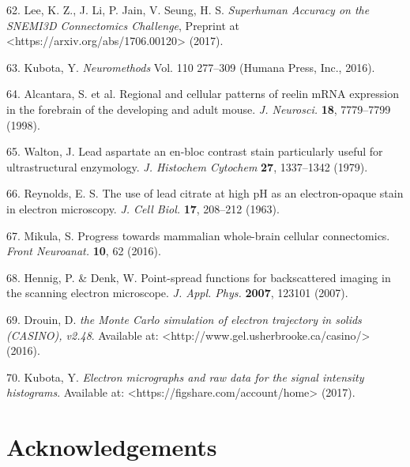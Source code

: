 \documentclass{article}
\begin{document}
\begin{hangpars}
62. Lee, K. Z., J. Li, P. Jain, V. Seung, H. S. \emph{Superhuman Accuracy on the SNEMI3D Connectomics Challenge}, Preprint at <https://arxiv.org/abs/1706.00120> (2017).

63. Kubota, Y. \emph{Neuromethods} Vol. 110 277–309 (Humana Press, Inc., 2016).

64. Alcantara, S. et al. Regional and cellular patterns of reelin mRNA expression in the forebrain of the developing and adult mouse. \emph{J. Neurosci.} \textbf{18}, 7779–7799 (1998).

65. Walton, J. Lead aspartate an en-bloc contrast stain particularly useful for ultrastructural enzymology. \emph{J. Histochem Cytochem} \textbf{27}, 1337–1342 (1979).

66. Reynolds, E. S. The use of lead citrate at high pH as an electron-opaque stain in electron microscopy. \emph{J. Cell Biol.} \textbf{17}, 208–212 (1963).

67. Mikula, S. Progress towards mammalian whole-brain cellular connectomics. \emph{Front Neuroanat.} \textbf{10}, 62 (2016).

68. Hennig, P. \& Denk, W. Point-spread functions for backscattered imaging in the scanning electron microscope. \emph{J. Appl. Phys.} \textbf{2007}, 123101 (2007).

69. Drouin, D. \emph{the Monte Carlo simulation of electron trajectory in solids (CASINO), v2.48}. Available at: <http://www.gel.usherbrooke.ca/casino/> (2016).

70. Kubota, Y. \emph{Electron micrographs and raw data for the signal intensity histograms}. Available at: <https://figshare.com/account/home> (2017).
\end{hangpars}

\section*{Acknowledgements}
\end{document}
